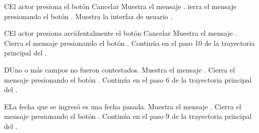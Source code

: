 
\begin{UCtrayectoriaA}{C}{El actor presiona el botón Cancelar}
    \UCpaso Muestra el mensaje .
    \UCpaso[\UCactor] ierra el mensaje presionando el botón .
    \UCpaso Muestra la interfaz de usuario .
\end{UCtrayectoriaA}


\begin{UCtrayectoriaA}{C}{El actor presiona accidentalmente el botón Cancelar}
    \UCpaso Muestra el mensaje .
    \UCpaso[\UCactor] Cierra el mensaje presionando el botón .
    \UCpaso Continúa en el paso 10 de la trayectoria principal del .
\end{UCtrayectoriaA}


\begin{UCtrayectoriaA}{D}{Uno o más campos no fueron contestados.}
    \UCpaso Muestra el mensaje .
    \UCpaso[\UCactor] Cierra el mensaje presionando el botón .
    \UCpaso Continúa en el paso 6 de la trayectoria principal del .
\end{UCtrayectoriaA}


\begin{UCtrayectoriaA}{E}{La fecha que se ingresó es una fecha pasada.}
    \UCpaso Muestra el mensaje .
    \UCpaso[\UCactor] Cierra el mensaje presionando el botón .
    \UCpaso Continúa en el paso 9 de la trayectoria principal del .
\end{UCtrayectoriaA}